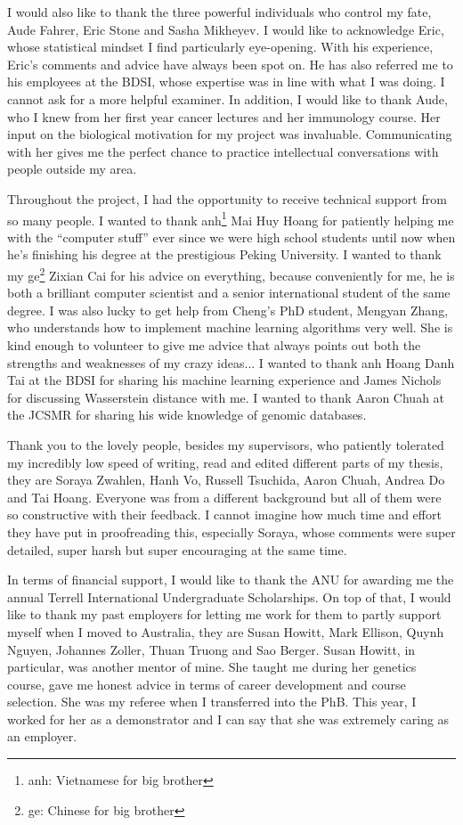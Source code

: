 I would also like to thank the three powerful individuals who control my fate, Aude Fahrer, Eric Stone and Sasha Mikheyev. I would like to acknowledge Eric, whose statistical mindset I find particularly eye-opening. With his experience, Eric's comments and advice have always been spot on. He has also referred me to his employees at the BDSI, whose expertise was in line with what I was doing. I cannot ask for a more helpful examiner. In addition, I would like to thank Aude, who I knew from her first year cancer lectures and her immunology course. Her input on the biological motivation for my project was invaluable. Communicating with her gives me the perfect chance to practice intellectual conversations with people outside my area.

Throughout the project, I had the opportunity to receive technical support from so many people. I wanted to thank anh\footnote{anh: Vietnamese for big brother} Mai Huy Hoang for patiently helping me with the ``computer stuff'' ever since we were high school students until now when he's finishing his degree at the prestigious Peking University. I wanted to thank my ge\footnote{ge: Chinese for big brother} Zixian Cai for his advice on everything, because conveniently for me, he is both a brilliant computer scientist and a senior international student of the same degree. I was also lucky to get help from Cheng's PhD student, Mengyan Zhang, who understands how to implement machine learning algorithms very well. She is kind enough to volunteer to give me advice that always points out both the strengths and weaknesses of my crazy ideas... I wanted to thank anh Hoang Danh Tai at the BDSI for sharing his machine learning experience and James Nichols for discussing Wasserstein distance with me. I wanted to thank Aaron Chuah at the JCSMR for sharing his wide knowledge of genomic databases. 

Thank you to the lovely people, besides my supervisors, who patiently tolerated my incredibly low speed of writing, read and edited different parts of my thesis, they are Soraya Zwahlen, Hanh Vo, Russell Tsuchida, Aaron Chuah, Andrea Do and Tai Hoang. Everyone was from a different background but all of them were so constructive with their feedback. I cannot imagine how much time and effort they have put in proofreading this, especially Soraya, whose comments were super detailed, super harsh but super encouraging at the same time. 

In terms of financial support, I would like to thank the ANU for awarding me the annual Terrell International Undergraduate Scholarships. On top of that, I would like to thank my past employers for letting me work for them to partly support myself when I moved to Australia, they are Susan Howitt, Mark Ellison, Quynh Nguyen, Johannes Zoller, Thuan Truong and Sao Berger. Susan Howitt, in particular, was another mentor of mine. She taught me during her genetics course, gave me honest advice in terms of career development and course selection. She was my referee when I transferred into the PhB. This year, I worked for her as a demonstrator and I can say that she was extremely caring as an employer. 

